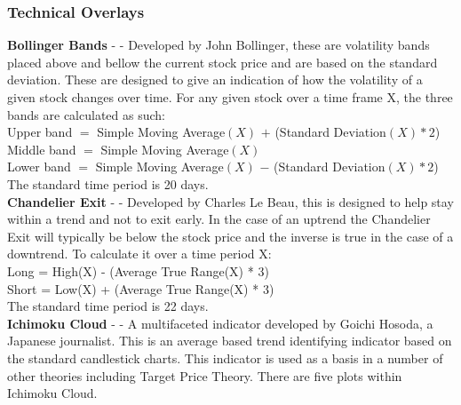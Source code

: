 \documentclass[12pt,a4paper]{article}
\begin{document}
\iffalse
#################################################################################
\fi

\subsubsection*{Technical Overlays}

\textbf{Bollinger Bands} - \cite{Bollinger1992} - Developed by John Bollinger, these are volatility bands placed above and bellow the current stock price and are based on the standard deviation. These are designed to give an indication of how the volatility of a given stock changes over time. For any given stock over a time frame X, the three bands are calculated as such:\\

\noindent
Upper band $=$ Simple Moving Average$(X)$ $+$ (Standard Deviation$(X) * 2$)\\
Middle band $=$ Simple Moving Average$(X)$\\
Lower band $=$ Simple Moving Average$(X)$ $-$ (Standard Deviation$(X) * 2$)\\
The standard time period is 20 days.\\

\iffalse
[]
\fi

\noindent
\textbf{Chandelier Exit} - \cite{Elder2002} - Developed by Charles Le Beau, this is designed to help stay within a trend and not to exit early. In the case of an uptrend the Chandelier Exit will typically be below the stock price and the inverse is true in the case of a downtrend. To calculate it over a time period X:\\

\noindent
Long = High(X) - (Average True Range(X) * 3)\\
Short = Low(X) + (Average True Range(X) * 3)\\

\noindent
The standard time period is 22 days.\\

\iffalse
[]
\fi

\noindent
\textbf{Ichimoku Cloud} - \cite{Murphy1999} - A multifaceted indicator developed by Goichi Hosoda, a Japanese journalist. This is an average based trend identifying indicator based on the standard candlestick charts. This indicator is used as a basis in a number of other theories including Target Price Theory. There are five plots within Ichimoku Cloud.\\
\end{document}
